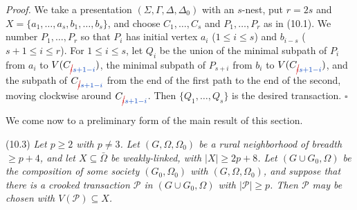 \textit{Proof.} We take a presentation $(\Sigma, \Gamma, \Delta, \Delta_0)$ with an $s$-nest, put $r = 2s$ and $X = \{a_1, \dots, a_s, b_1, \dots, b_s\}$, and choose $C_1, \dots, C_s$ and $P_1, \dots, P_r$ as in (10.1). We number $P_1, \dots, P_r$ so that $P_i$ has initial vertex $a_i$ ($1 \le i \le s$) and $b_{i-s}$ ($s+1 \le i \le r$). For $1 \le i \le s$, let $Q_i$ be the union of the minimal subpath of $P_i$ from $a_i$ to $V(C_{\delm{i}\fix{s+1-i}})$, the minimal subpath of $P_{s+i}$ from $b_i$ to $V(C_{\delm{i}\fix{s+1-i}})$, and the subpath of $C_{\delm{i}\fix{s+1-i}}$ from the end of the first path to the end of the second, moving clockwise around $C_{\delm{i}\fix{s+1-i}}$. Then $\{Q_1, \dots, Q_s\}$ is the desired transaction. $\square$

We come now to a preliminary form of the main result of this section.

\stmt
(10.3) \textit{Let $p \ge 2$ with $p \ne 3$. Let $(G, \Omega, \Omega_0)$ be a rural neighborhood of breadth $\ge p + 4$, and let $X \subseteq \bar{\Omega}$ be weakly-linked, with $|X| \ge 2p + 8$. Let $(G \cup G_0, \Omega)$ be the composition of some society $(G_0, \Omega_0)$ with $(G, \Omega, \Omega_0)$, and suppose that there is a crooked transaction $\mathscr{P}$ in $(G \cup G_0, \Omega)$ with $|\mathscr{P}| \ge p$. Then $\mathscr{P}$ may be chosen with $V(\mathscr{P}) \subseteq X$.}

